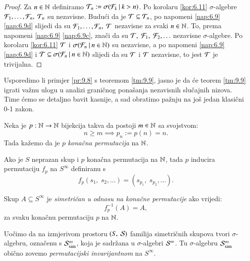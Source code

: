 \begin{proof}
    Za $n \in \mathbb{N}$ definiramo $\mathcal{T}_n := \sigma({\mathcal{F}_k} \: | \: {k > n})$.
    Po korolaru \ref{kor:6.11} $\sigma$-algebre $\mathcal{F}_1, \ldots, \mathcal{F}_n, \; \mathcal{T}_n$ su nezavisne.
    Budu\' ci da je $\mathcal{T} \subseteq \mathcal{T}_n$, po napomeni \ref{nap:6.9} \ref{nap:6.9d} slijedi da su $\mathcal{F}_1, \ldots, \mathcal{F}_n, \; \mathcal{T}$ nezavisne za svaki $n \in \mathbb{N}$.
    To, prema napomeni \ref{nap:6.9} \ref{nap:6.9c}, zna\v ci da su $\mathcal{T}, \; \mathcal{F}_1, \; \mathcal{F}_2, \ldots$ nezavisne $\sigma$-algebre.
    Po korolaru \ref{kor:6.11} $\mathcal{T}$ i $\sigma({\mathcal{F}_n} \: | \: {n \in \mathbb{N}})$ su nezavisne, a po napomeni \ref{nap:6.9} \ref{nap:6.9d} i $\mathcal{T} \subseteq \sigma({\mathcal{F}_n} \: | \: {n \in \mathbb{N}})$ slijedi da su $\mathcal{T}$ i $\mathcal{T}$ nezavisne, to jest $\mathcal{T}$ je trivijalna.
\end{proof}

Usporedimo li primjer \ref{pr:9.8} s teoremom \ref{tm:9.9}, jasno je da \' ce teorem \ref{tm:9.9} igrati va\v znu ulogu u analizi grani\v cnog pona\v sanja nezavisnih slu\v cajnih nizova.
Time \' cemo se detaljno bavit kasnije, a sad obratimo pa\v znju na jo\v s jedan klasi\v cni 0-1 zakon.

\begin{defn}    \label{defn:9.9-1}
    Neka je $p: \mathbb{N} \to \mathbb{N}$ bijekcija takva da postoji $m \in \mathbb{N}$ sa svojstvom:
    \begin{equation*}
        n \geq m \implies p_n := p(n) = n.
    \end{equation*}
    Tada ka\v zemo da je $p$ \emph{kona\v cna permutacija} na $\mathbb{N}$.
\end{defn}

Ako je $S$ neprazan skup i $p$ kona\v cna permutacija na $\mathbb{N}$, tada $p$ inducira permutaciju $f_p$ na $S^\infty$ definiranu s
\begin{equation*}
    f_p (s_1, \; s_2, \ldots) = (s_{p_1}, \; s_{p_2}, \ldots).
\end{equation*}

\begin{defn}    \label{defn:9.9-2}
    Skup $A \subseteq S^\infty$ je \emph{simetri\v can u odnosu na kona\v cne permutacije} ako vrijedi:
    \begin{equation*}
        f_p^{-1} (A) = A,
    \end{equation*}
    za svaku kona\v cnu permutaciju $p$ na $\mathbb{N}$.
\end{defn}

Uo\v cimo da na izmjerivom prostoru $({S}, \: {\mathcal{S}})$ familija simetri\v cnih skupova tvori $\sigma$-algebru, ozna\v cenu s $\mathcal{S}_{\mathrm{sim}}^\infty$, koja je sadr\v zana u $\sigma$-algebri $\mathcal{S}^\infty$.
Tu $\sigma$-algebru $\mathcal{S}_{\mathrm{sim}}^{\infty}$ obi\v cno zovemo \emph{permutacijski invarijantnom} na $S^\infty$.


